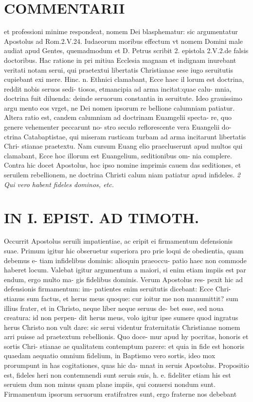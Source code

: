 \documentclass{article}
\begin{document}
\begin{pages}
\section*{COMMENTARII }
\marginpar{[ p.146 ]}\pstart et professioni minime respondeat, nomem Dei blasphematur: sic argumentatur Apostolus ad Rom.2.V.24. Iudaeorum moribus effectum vt nomem Domini male audiat apud Gentes, quemadmodum et D. Petrus scribit 2. epistola 2.V.2.de falsis doctoribus. Hac ratione in pri mitiua Ecclesia magnam et indignam inurebant veritati notam serui, qui praetextui libertatis Christianae sese iugo seruitutis cupiebant exi mere. Hinc. n. Ethnici clamabant, Ecce haec il lorum est doctrina, reddit nobis seruos sedi- tiosos, etmancipia ad arma incitat:quae calu- mnia, doctrina fuit diluenda: deinde seruorum constantia in seruitute. Ideo grauissimo argu mento eos vrget, ne Dei nomen ipsorum re bellione calumniam patiatur. Altera ratio est, candem calumniam ad doctrinam Euamgelii specta- re, quo genere vehementer peccarunt no- stro seculo reflorescente vera Euangelii do- ctrina Catabaptistae, qui miseram rusticam turbam ad arma incitarunt libertatis Chri- stianae praetextu. Nam cursum Euang elio praecluserunt apud multos qui clamabant, Ecce hoc illorum est Euangelium, seditionibus om- nia complere. Contra hic docet Apostolus, hoc ipso nomine imprimis cauem das seditiones, et seruilem rebellionem, ne doctrina Christi calum niam patiatur apud infideles.  \pend
\textit{2 Qui vero habent fideles dominos, etc. }
\section*{IN I. EPIST. AD TIMOTH. }
\marginpar{[ p.147 ]}\pstart Occurrit Apostolus seruili impatientiae, ac eripit ei firmamentum defensionis suae. Primum igitur hic obseruetur superiora pro prie loqui de obedientia, quam debemus e- tiam infidelibus dominis: alioquin praeoccu- patio haec non commode haberet locum. Valebat igitur argumentum a maiori, si enim etiam impiis est par endum, ergo multo ma- gis fidelibus dominis. Verum Apostolus res- pexit hic ad defensionis firmamentum: im- patientes enim seruitutis dicebant: Ecce Chri- stianus sum factus, et herus meus quoque: cur ioitur me non manumittit? sum illius frater, et in Christo, neque liber neque seruus de- bet esse, sed noua creatura: id non perpen- dit herus meus, volo igitur ipse sumere quod ingratus herus Christo non vult dare: sic serui videntur fraternitatis Christianae nomem arri puisse ad praetextum rebellionis. Quo doce- mur apud hy pocritas, honoris et sortis Chri- stianae ae qualitatem contemptum parere: et quia in fide est honoris quaedam aequatio omnium fidelium, in Baptismo vero sortis, ideo mox prorumpunt in has cogitationes, quas hic da- mnat in seruis Apostolus. Propositio est, fideles heri non contemnendi sunt seruis suis, h. e. fideliter etiam his est seruiem dum non minus quam plane impiis, qui conuersi  \pend\pstart nondum sunt. Firmamentum ipsorum seruorum eratifratres sunt, ergo fraterne nos debebant  \pend

\end{pages}
\end{document}
